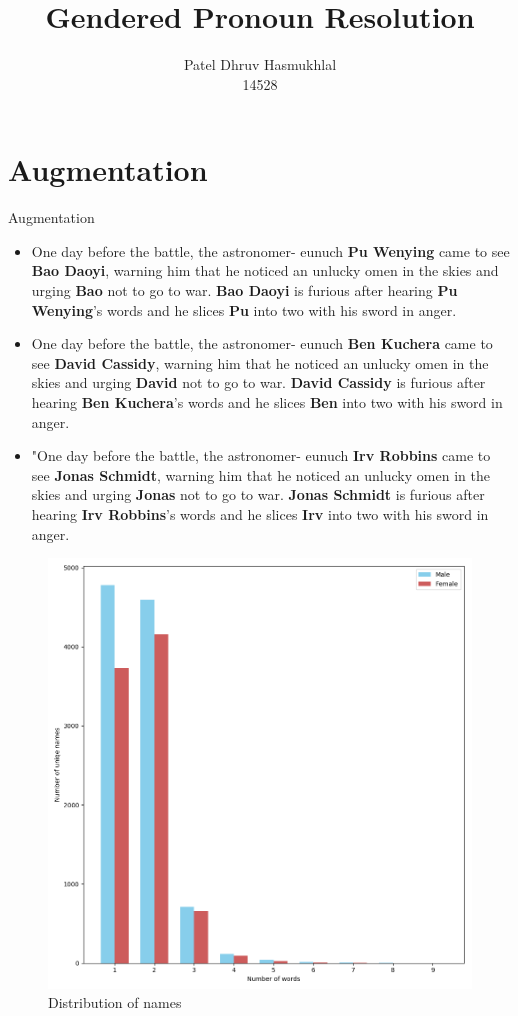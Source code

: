 \documentclass[10pt]{beamer}
\title{Gendered Pronoun Resolution}
\author[Dhruv (14528)]{Patel Dhruv Hasmukhlal \\14528}
\institute[CSA, IISc.]{Computer Science and Automation, Indian Institute of Science}
\begin{document}
\begin{frame}
  \maketitle
\end{frame}

\section{Augmentation}
\begin{frame}{Augmentation}

  \begin{itemize}
  \item One day before the battle, the astronomer- eunuch \textbf{Pu Wenying} came to see \textbf{Bao Daoyi}, warning him that he noticed an unlucky omen in the skies and urging \textbf{Bao} not to go to war. \textbf{Bao Daoyi} is furious after hearing \textbf{Pu Wenying}'s words and he slices \textbf{Pu} into two with his sword in anger.
  
  \item One day before the battle, the astronomer- eunuch \textbf{Ben Kuchera} came to see \textbf{David Cassidy}, warning him that he noticed an unlucky omen in the skies and urging \textbf{David} not to go to war. \textbf{David Cassidy} is furious after hearing \textbf{Ben Kuchera}'s words and he slices \textbf{Ben} into two with his sword in anger.
  
  \item "One day before the battle, the astronomer- eunuch \textbf{Irv Robbins} came to see \textbf{Jonas Schmidt}, warning him that he noticed an unlucky omen in the skies and urging \textbf{Jonas} not to go to war. \textbf{Jonas Schmidt} is furious after hearing \textbf{Irv Robbins}'s words and he slices \textbf{Irv} into two with his sword in anger.
    
  \end{itemize}
\end{frame}

\begin{frame}
  \begin{figure}
    \centering
    \includegraphics[width=.7\textwidth]{augment_dist.png}
    \caption{Distribution of names}
    \label{fig:dist_names}
  \end{figure}
\end{frame}
\end{document}
